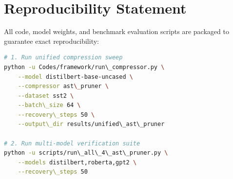 \section{Reproducibility Statement}
All code, model weights, and benchmark evaluation scripts are packaged to guarantee exact reproducibility:
\begin{lstlisting}[language=bash]
# 1. Run unified compression sweep
python -u Codes/framework/run\_compressor.py \
    --model distilbert-base-uncased \
    --compressor ast\_pruner \
    --dataset sst2 \
    --batch\_size 64 \
    --recovery\_steps 50 \
    --output\_dir results/unified\_ast\_pruner

# 2. Run multi-model verification suite
python -u scripts/run\_all\_4\_ast\_pruner.py \
    --models distilbert,roberta,gpt2 \
    --recovery\_steps 50
\end{lstlisting}
